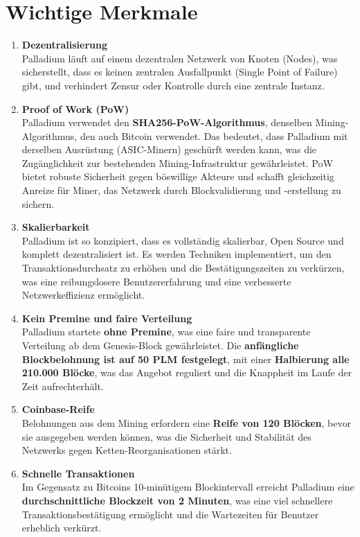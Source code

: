 \documentclass[11pt,a4paper]{article}
\begin{document}
\section{Wichtige Merkmale}
\begin{enumerate}
    \item \textbf{Dezentralisierung} \\ 
    Palladium läuft auf einem dezentralen Netzwerk von Knoten (Nodes), was sicherstellt, dass es keinen zentralen Ausfallpunkt (Single Point of Failure) gibt, und verhindert Zensur oder Kontrolle durch eine zentrale Instanz.

    \item \textbf{Proof of Work (PoW)} \\ 
    Palladium verwendet den \textbf{SHA256-PoW-Algorithmus}, denselben Mining-Algorithmus, den auch Bitcoin verwendet. Das bedeutet, dass Palladium mit derselben Ausrüstung (ASIC-Minern) geschürft werden kann, was die Zugänglichkeit zur bestehenden Mining-Infrastruktur gewährleistet. PoW bietet robuste Sicherheit gegen böswillige Akteure und schafft gleichzeitig Anreize für Miner, das Netzwerk durch Blockvalidierung und -erstellung zu sichern.

    \item \textbf{Skalierbarkeit} \\ 
    Palladium ist so konzipiert, dass es vollständig skalierbar, Open Source und komplett dezentralisiert ist. Es werden Techniken implementiert, um den Transaktionsdurchsatz zu erhöhen und die Bestätigungszeiten zu verkürzen, was eine reibungslosere Benutzererfahrung und eine verbesserte Netzwerkeffizienz ermöglicht.

    \item \textbf{Kein Premine und faire Verteilung} \\ 
    Palladium startete \textbf{ohne Premine}, was eine faire und transparente Verteilung ab dem Genesis-Block gewährleistet. Die \textbf{anfängliche Blockbelohnung ist auf 50 PLM festgelegt}, mit einer \textbf{Halbierung alle 210.000 Blöcke}, was das Angebot reguliert und die Knappheit im Laufe der Zeit aufrechterhält.

    \item \textbf{Coinbase-Reife} \\ 
    Belohnungen aus dem Mining erfordern eine \textbf{Reife von 120 Blöcken}, bevor sie ausgegeben werden können, was die Sicherheit und Stabilität des Netzwerks gegen Ketten-Reorganisationen stärkt.

    \item \textbf{Schnelle Transaktionen} \\ 
    Im Gegensatz zu Bitcoins 10-minütigem Blockintervall erreicht Palladium eine \textbf{durchschnittliche Blockzeit von 2 Minuten}, was eine viel schnellere Transaktionsbestätigung ermöglicht und die Wartezeiten für Benutzer erheblich verkürzt.


\end{enumerate}
\end{document}
